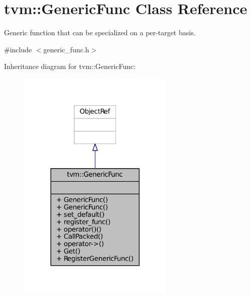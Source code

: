 \hypertarget{classtvm_1_1GenericFunc}{}\section{tvm\+:\+:Generic\+Func Class Reference}
\label{classtvm_1_1GenericFunc}


Generic function that can be specialized on a per-\/target basis.  




{\ttfamily \#include $<$generic\+\_\+func.\+h$>$}



Inheritance diagram for tvm\+:\+:Generic\+Func\+:
\nopagebreak
\begin{figure}[H]
\begin{center}
\leavevmode
\includegraphics[width=212pt]{classtvm_1_1GenericFunc__inherit__graph}
\end{center}
\end{figure}


